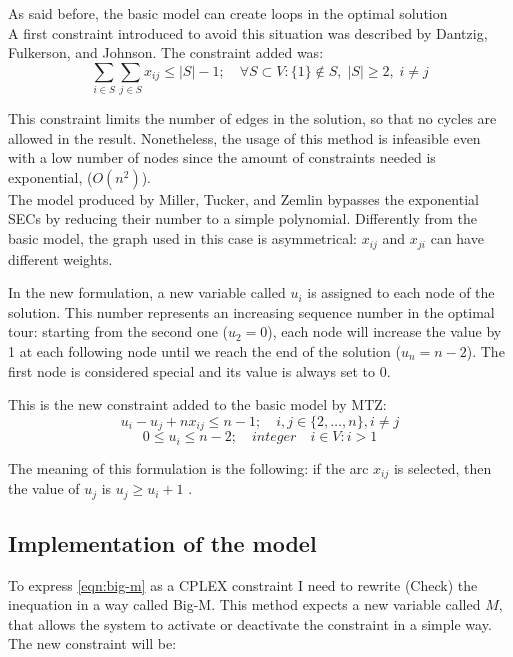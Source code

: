 As said before, the basic model can create loops in the optimal solution\\
A first constraint introduced to avoid this situation was described by Dantzig, Fulkerson, and Johnson. The constraint added was:
\begin{equation}
\sum_{i\in S}\sum_{j \in S}x_{ij}\le |S|-1; \quad \forall S \subset V:\{1\}\not \in S, \; |S|\ge 2, \; i\not = j
\end{equation}


This constraint limits the number of edges in the solution, so that no cycles are allowed in the result. Nonetheless, the usage of this method is infeasible even with a low number of nodes since the amount of constraints needed is exponential, ($O(n^2)$).\\

The model produced by Miller, Tucker, and Zemlin bypasses the exponential SECs by reducing their number to a simple polynomial.  Differently from the basic model, the graph used in this case is asymmetrical: $x_{ij}$ and $x_{ji}$ can have different weights.

In the new formulation, a new variable called $u_i$ is assigned to each node of the solution. This number represents an increasing sequence number in the optimal tour: starting from the second one ($u_2=0$), each node will increase the value by 1 at each following node until we reach the end of the solution ($u_n=n-2$). The first node is considered special and its value is always set to $0$.

This is the new constraint added to the basic model by MTZ:
	\begin{equation}
	\label{eqn:big-m}
	u_i-u_j+nx_{ij}\le n-1; \quad i,j\in \{2, \dots, n\}, i \not=j
	\end{equation}
	\begin{equation}
	\label{eqn:u-bound}
	0 \le u_i \le n-2; \quad integer \quad i \in V:i>1
	\end{equation}


The meaning of this formulation is the following: if the arc $x_{ij}$ is selected, then the value of $u_j$ is $u_j \ge u_i+1$ .

\subsection{Implementation of the model}
To express \ref{eqn:big-m} as a CPLEX constraint I need to rewrite (Check) the inequation in a way called Big-M. This method expects a new variable called $M$, that allows the system to activate or deactivate the constraint in a simple way. The new constraint will be:


